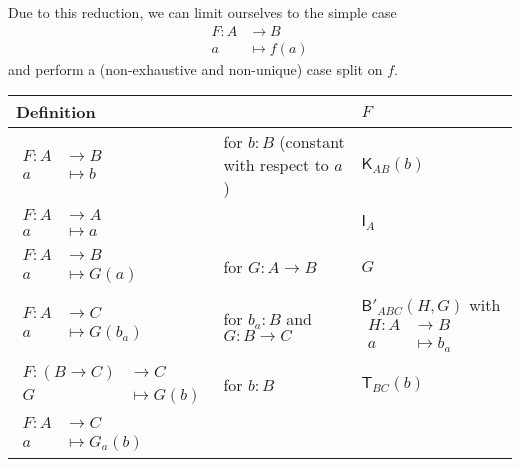 \documentclass[a4paper]{article}
\theoremstyle{definition}
\theoremstyle{remark}
\newcommand{\nm}{\mathsf}
\newcommand{\combinator}{\nm}
\newcommand{\idFun}{\combinator{I}}
\newcommand{\appFun}{\combinator{T}}
\newcommand{\constFun}{\combinator{K}}
\newcommand{\compFun}{\combinator{B'}}
\begin{document}
Due to this reduction, we can limit ourselves to the simple case
\begin{align*}
  F : A &\to     B\\
      a &\mapsto f(a)
\end{align*}
and perform a (non-exhaustive and non-unique) case split on $f.$

\begin{longtable}{ll|l}
  Definition & & $F$\\
  \hline\hline
  \rule{0pt}{2em}
  $\begin{aligned}
    F : A &\to     B\\
        a &\mapsto b
  \end{aligned}$ &
  \parbox{3cm}{for $b : B$ (constant \\ with respect to $a$)} &
  $\constFun_{AB}(b)$\\
  \hline
  \rule{0pt}{2em}
  $\begin{aligned}
    F : A &\to     A\\
        a &\mapsto a
  \end{aligned}$ & &
  $\idFun_A$\\
  \hline
  \rule{0pt}{2em}
  $\begin{aligned}
    F : A &\to     B\\
        a &\mapsto G(a)
  \end{aligned}$ &
  for $G : A \to B$ &
  $G$\\
  \hline
  \rule{0pt}{2em}
  $\begin{aligned}
    F : A &\to     C\\
        a &\mapsto G(b_a)
  \end{aligned}$ &
  \parbox{3cm}{for $b_a : B$ \\ and $G : B \to C$} &
  $\compFun_{ABC}(H,G)$ with
  $\begin{aligned}
    H : A &\to     B\\
        a &\mapsto b_a
  \end{aligned}$\\
  \hline
  \rule{0pt}{2em}
  $\begin{aligned}
    F : (B \to C) &\to     C\\
        G         &\mapsto G(b)
  \end{aligned}$ &
  for $b : B$ &
  $\appFun_{BC}(b)$\\
  \hline
  \rule{0pt}{2em}
  $\begin{aligned}
    F : A &\to     C\\
        a &\mapsto G_a(b)
  \end{aligned}$ &

\end{longtable}
\end{document}
